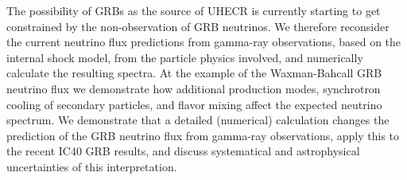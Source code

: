 


\bigskip



\bigskip

\noindent The possibility of GRBs as the source of UHECR is currently starting to get constrained by the non-observation of GRB neutrinos. We therefore reconsider the current neutrino flux predictions
from gamma-ray observations, based on the internal shock model, from the particle physics involved, and numerically calculate the resulting spectra. At the example of the Waxman-Bahcall GRB neutrino flux we demonstrate how additional production modes, synchrotron cooling of secondary particles, and flavor mixing affect the expected neutrino spectrum. We demonstrate that a detailed (numerical) calculation changes the prediction of the GRB neutrino flux from gamma-ray observations, apply this to the recent IC40 GRB results, and discuss systematical and astrophysical uncertainties of this interpretation.
